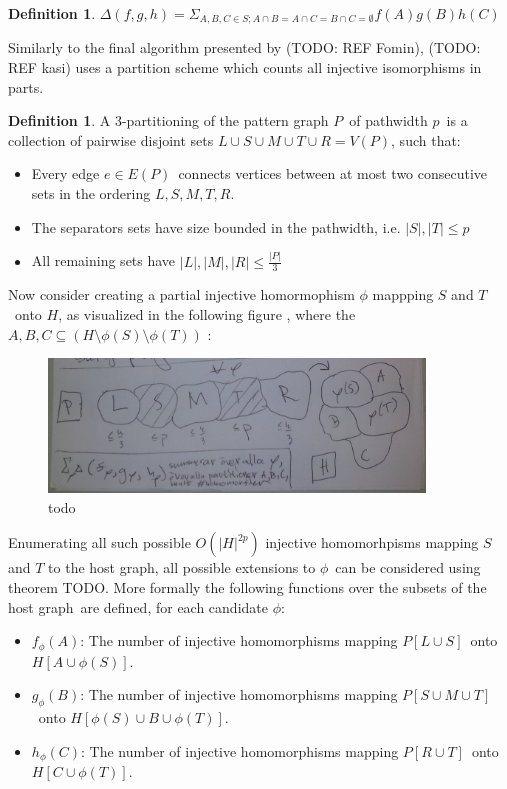 \documentclass[a4paper,11pt,notitlepage]{report}
\theoremstyle{plain}
\theoremstyle{definition}
\newtheorem{defn}[thm]{Definition} %
\begin{document}
\begin{defn}
$\Delta(f, g, h) = \Sigma_{A, B, C \in S ; A \cap B = A \cap C = B \cap C = \emptyset} f(A)g(B)h(C)$
\end{defn}

Similarly to the final algorithm presented by (TODO: REF Fomin), (TODO: REF kasi) uses a partition scheme which counts all injective isomorphisms in parts.

\begin{defn}
A 3-partitioning of the pattern graph $P$ of pathwidth $p$ is a collection of pairwise disjoint sets $L \cup S \cup M \cup T \cup R = V(P)$, such that:
\begin{itemize}
\item Every edge $e \in E(P)$ connects vertices between at most two consecutive sets in the ordering $L, S, M, T, R$.
\item The separators sets have size bounded in the pathwidth, i.e. $|S|, |T| \leq p$
\item All remaining sets have $|L|, |M|, |R| \leq \frac{|P|}{3}$
\end{itemize}
\end{defn}

Now consider creating a partial injective homormophism $\phi$ mappping $S$ and $T$ onto $H$, as visualized in the following figure
, where the $A,B,C \subseteq (H \setminus \phi(S) \setminus \phi(T))$ :

\begin{figure}[here]
\centering
\includegraphics[width=10cm]{images/sketch_homo.png} 
\caption[todo]{todo}
\label{fig:homo-viz}
\end{figure}

Enumerating all such possible $O(|H|^{2p})$ injective homomorhpisms mapping $S$ and $T$ to the host graph,
 all possible extensions to $\phi$ can be considered using theorem TODO.
More formally the following functions over the subsets of the host graph are defined, for each candidate $\phi$:

\begin{itemize}
\item $f_\phi(A)$: The number of injective homomorphisms mapping $P[L \cup S]$ onto $H[A \cup \phi(S)]$.
\item $g_\phi(B)$: The number of injective homomorphisms mapping $P[S \cup M \cup T]$ onto $H[\phi(S) \cup B \cup \phi(T)]$.
\item $h_\phi(C)$: The number of injective homomorphisms mapping $P[R \cup T]$ onto $H[C \cup \phi(T)]$.
\end{itemize}
\end{document}

